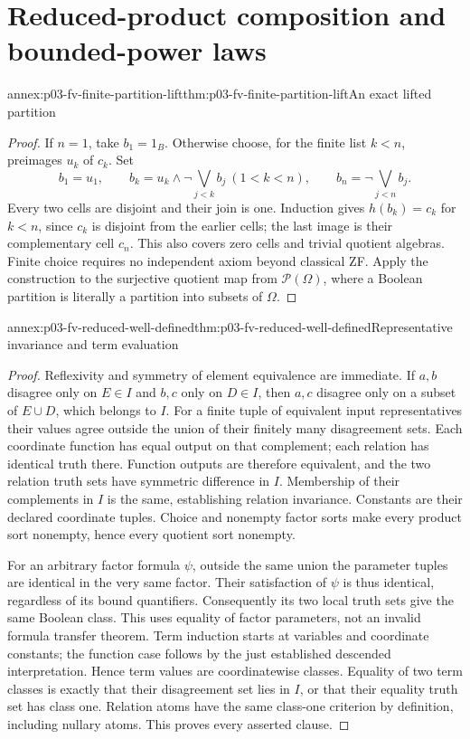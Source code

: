\section{Reduced-product composition and bounded-power laws}
\label{sec:p03-fv-reduced-annex}

\begin{annexitem}{annex:p03-fv-finite-partition-lift}{thm:p03-fv-finite-partition-lift}{An exact lifted partition}
\begin{proof}
If \(n=1\), take \(b_1=1_B\). Otherwise choose, for the finite
list \(k<n\), preimages \(u_k\) of \(c_k\). Set
\[
 b_1=u_1,\qquad
 b_k=u_k\wedge\neg\bigvee_{j<k}b_j\ (1<k<n),\qquad
 b_n=\neg\bigvee_{j<n}b_j.
\]
Every two cells are disjoint and their join is one. Induction gives
\(h(b_k)=c_k\) for \(k<n\), since \(c_k\) is disjoint from the
earlier cells; the last image is their complementary cell \(c_n\).
This also covers zero cells and trivial quotient algebras. Finite choice
requires no independent axiom beyond classical ZF. Apply the construction
to the surjective quotient map from \(\mathcal P(\Omega)\), where a
Boolean partition is literally a partition into subsets of \(\Omega\).
\end{proof}
\end{annexitem}

\begin{annexitem}{annex:p03-fv-reduced-well-defined}{thm:p03-fv-reduced-well-defined}{Representative invariance and term evaluation}
\begin{proof}
Reflexivity and symmetry of element equivalence are immediate. If \(a,b\)
disagree only on \(E\in I\) and \(b,c\) only on \(D\in I\),
then \(a,c\) disagree only on a subset of \(E\cup D\), which belongs
to \(I\). For a finite tuple of equivalent input representatives their
values agree outside the union of their finitely many disagreement sets.
Each coordinate function has equal output on that complement; each relation
has identical truth there. Function outputs are therefore equivalent, and
the two relation truth sets have symmetric difference in \(I\). Membership
of their complements in \(I\) is the same, establishing relation invariance.
Constants are their declared coordinate tuples. Choice and nonempty factor
sorts make every product sort nonempty, hence every quotient sort nonempty.

For an arbitrary factor formula \(\psi\), outside the same union the
parameter tuples are identical in the very same factor. Their satisfaction
of \(\psi\) is thus identical, regardless of its bound quantifiers.
Consequently its two local truth sets give the same Boolean class. This
uses equality of factor parameters, not an invalid formula transfer theorem.
Term induction starts at variables and coordinate constants; the function
case follows by the just established descended interpretation. Hence term
values are coordinatewise classes. Equality of two term classes is exactly
that their disagreement set lies in \(I\), or that their equality truth
set has class one. Relation atoms have the same class-one criterion by
definition, including nullary atoms. This proves every asserted clause.
\end{proof}
\end{annexitem}

